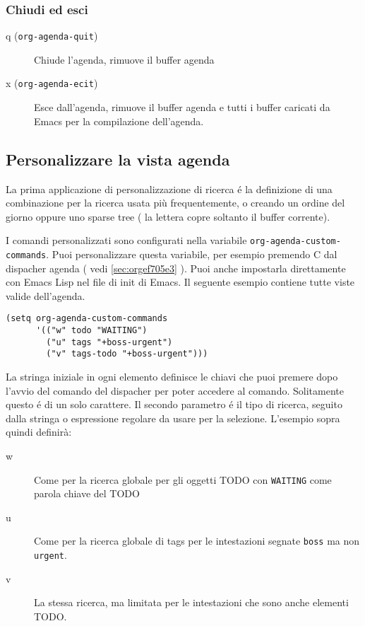 \documentclass[11pt]{article}
\begin{document}
\subsubsection*{Chiudi ed esci}
\label{sec:org6c23ada}
\begin{description}
\item[{q (\texttt{org-agenda-quit})}] Chiude l'agenda, rimuove il buffer agenda

\item[{x (\texttt{org-agenda-ecit})}] Esce dall'agenda, rimuove il buffer agenda e tutti i buffer caricati
da Emacs per la compilazione dell'agenda.
\end{description}

\subsection{Personalizzare la vista agenda}
\label{sec:org57a3e93}
La prima applicazione di personalizzazione di ricerca é la definizione
di una combinazione per la ricerca usata più frequentemente, o creando
un ordine del giorno oppure uno sparse tree ( la lettera copre soltanto
il buffer corrente).

I comandi personalizzati sono configurati nella variabile
\texttt{org-agenda-custom-commands}. Puoi personalizzare questa variabile,
per esempio premendo C dal dispacher agenda ( vedi \ref{sec:orgef705e3} ). Puoi anche impostarla direttamente con Emacs
Lisp nel file di init di Emacs. Il seguente esempio contiene tutte
viste valide dell'agenda.

\begin{verbatim}
(setq org-agenda-custom-commands
      '(("w" todo "WAITING")
        ("u" tags "+boss-urgent")
        ("v" tags-todo "+boss-urgent")))
\end{verbatim}

La stringa iniziale in ogni elemento definisce le chiavi che puoi
premere dopo l'avvio del comando del dispacher per poter accedere al
comando. Solitamente questo é di un solo carattere. Il secondo
parametro é il tipo di ricerca, seguito dalla stringa o espressione
regolare da usare per la selezione. L'esempio sopra quindi definirà:

\begin{description}
\item[{w}] Come per la ricerca globale per gli oggetti TODO con \texttt{WAITING} come
parola chiave del TODO

\item[{u}] Come per la ricerca globale di tags per le intestazioni segnate \texttt{boss} ma
non \texttt{urgent}.

\item[{v}] La stessa ricerca, ma limitata per le intestazioni che sono anche elementi
TODO.
\end{description}
\end{document}
